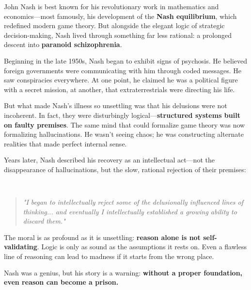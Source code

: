 \begin{tcolorbox}[title=Historical Sidebar: John Nash and the Logic of Delusion, colback=gray!5, colframe=black, fonttitle=\bfseries]

  John Nash is best known for his revolutionary work in mathematics and economics—most famously, his development of the \textbf{Nash equilibrium}, which redefined modern game theory. But alongside the elegant logic of strategic decision-making, Nash lived through something far less rational: a prolonged descent into \textbf{paranoid schizophrenia}.

  \medskip
  
  Beginning in the late 1950s, Nash began to exhibit signs of psychosis. He believed foreign governments were communicating with him through coded messages. He saw conspiracies everywhere. At one point, he claimed he was a political figure with a secret mission, at another, that extraterrestrials were directing his life. 

  \medskip
  
  But what made Nash’s illness so unsettling was that his delusions were not incoherent. In fact, they were disturbingly logical—\textbf{structured systems built on faulty premises}. The same mind that could formalize game theory was now formalizing hallucinations. He wasn’t seeing chaos; he was constructing alternate realities that made perfect internal sense.
  
  \medskip
  
  Years later, Nash described his recovery as an intellectual act—not the disappearance of hallucinations, but the slow, rational rejection of their premises:

  \medskip
  
  \ 

  \begin{quote}
      \textit{"I began to intellectually reject some of the delusionally influenced lines of thinking... and eventually I intellectually established a growing ability to discard them."}
  \end{quote}
  
  \medskip
  
  The moral is as profound as it is unsettling: \textbf{reason alone is not self-validating}. Logic is only as sound as the assumptions it rests on. Even a flawless line of reasoning can lead to madness if it starts from the wrong place. 
  
  \medskip
  
  Nash was a genius, but his story is a warning: \textbf{without a proper foundation, even reason can become a prison.}
  
\end{tcolorbox}




